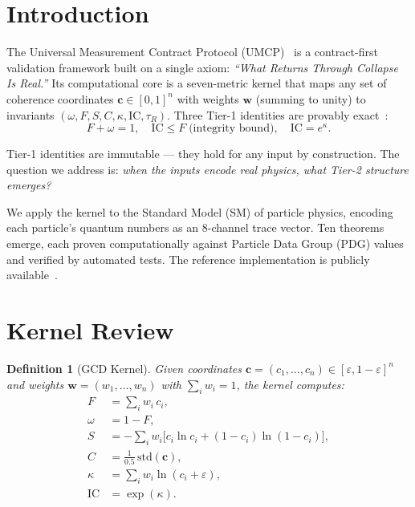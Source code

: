 \documentclass[
  aps,
  prd,
  twocolumn,
  superscriptaddress,
  nofootinbib,
  floatfix
]{revtex4-2}
\newtheorem{definition}[theorem]{Definition}
\newcommand{\eps}{\varepsilon}
\newcommand{\beq}{\begin{equation}}
\newcommand{\eeq}{\end{equation}}
\newcommand{\tvec}{\mathbf{c}}
\newcommand{\wvec}{\mathbf{w}}
\newcommand{\IC}{\mathrm{IC}}
\begin{document}
\section{Introduction}\label{sec:intro}

The Universal Measurement Contract Protocol
(UMCP)~\cite{paulus2025umcp,paulus2025physicscoherence} is a
contract-first validation framework built on a single axiom:
\emph{``What Returns Through Collapse Is Real.''} Its
computational core is a seven-metric kernel that maps any
set of coherence coordinates $\tvec \in [0,1]^n$ with weights
$\wvec$ (summing to unity) to invariants $(\omega, F, S, C,
\kappa, \IC, \tau_R)$.  Three Tier-1 identities are provably
exact~\cite{paulus2026umcpcasepack}:
\beq\label{eq:tier1}
  F + \omega = 1, \quad
  \IC \leq F \;\text{(integrity bound)}, \quad
  \IC = e^{\kappa}.
\eeq

Tier-1 identities are immutable --- they hold for any input
by construction.  The question we address is: \emph{when the
inputs encode real physics, what Tier-2 structure emerges?}

We apply the kernel to the Standard Model (SM) of particle
physics, encoding each particle's quantum numbers as an
8-channel trace vector.  Ten theorems emerge, each proven
computationally against Particle Data Group (PDG) values
and verified by automated tests.  The reference implementation
is publicly available~\cite{umcpmetadatarepo}.

\section{Kernel Review}\label{sec:kernel}

\begin{definition}[GCD Kernel]\label{def:kernel}
Given coordinates $\tvec = (c_1, \ldots, c_n) \in [\eps, 1-\eps]^n$
and weights $\wvec = (w_1, \ldots, w_n)$ with $\sum_i w_i = 1$,
the kernel computes:
\begin{align}
  F &= \sum_i w_i \, c_i, \label{eq:F} \\
  \omega &= 1 - F, \label{eq:omega} \\
  S &= -\sum_i w_i \bigl[c_i \ln c_i + (1{-}c_i)\ln(1{-}c_i)\bigr],
  \label{eq:S} \\
  C &= \frac{1}{0.5}\,\mathrm{std}(\tvec), \label{eq:C} \\
  \kappa &= \sum_i w_i \ln(c_i + \eps), \label{eq:kappa} \\
  \IC &= \exp(\kappa). \label{eq:IC}
\end{align}
\end{definition}
\end{document}
